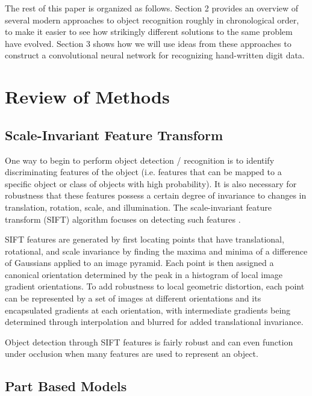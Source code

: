 \documentclass[10pt,twocolumn,letterpaper]{article}
\begin{document}
The rest of this paper is organized as follows.
Section 2 provides an overview of several modern approaches to object recognition
roughly in chronological order, to make it easier to see how strikingly different
solutions to the same problem have evolved.
Section 3 shows how we will use ideas from these approaches to construct
a convolutional neural network for recognizing hand-written digit data.

\section{Review of Methods}
\subsection{Scale-Invariant Feature Transform}

One way to begin to perform object detection / recognition is to identify discriminating
features of the object (i.e. features that can be mapped to a specific object or class of
objects with high probability). It is also necessary for robustness that these features
possess a certain degree of invariance to changes in translation, rotation, scale, and
illumination. The scale-invariant feature transform (SIFT) algorithm focuses on detecting
such features \cite{LoweObjSIFT}.

SIFT features are generated by first locating points that have translational, rotational,
and scale invariance by finding the maxima and minima of a difference of Gaussians
applied to an image pyramid. Each point is then assigned a canonical orientation
determined by the peak in a histogram of local image gradient orientations. To add
robustness to local geometric distortion, each point can be represented by a set of
images at different orientations and its encapsulated gradients at each orientation,
with intermediate gradients being determined through interpolation and blurred for
added translational invariance.

Object detection through SIFT features is fairly robust and can even function under
occlusion when many features are used to represent an object.

\subsection{Part Based Models}
\end{document}
